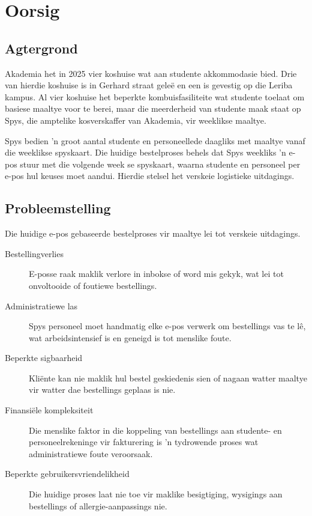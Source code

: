 \section{Oorsig}

\subsection{Agtergrond}
Akademia het in 2025 vier koshuise wat aan studente akkommodasie bied. Drie van
hierdie koshuise is in Gerhard straat geleë en een is gevestig op die Leriba
kampus. Al vier koshuise het beperkte kombuisfasiliteite wat studente toelaat om
basiese maaltye voor te berei, maar die meerderheid van studente maak staat op
Spys, die amptelike kosverskaffer van Akademia, vir weeklikse maaltye.

Spys bedien 'n groot aantal studente en personeellede daagliks met maaltye vanaf
die weeklikse spyskaart. Die huidige bestelproses behels dat Spys weekliks 'n
e-pos stuur met die volgende week se spyskaart, waarna studente en personeel per
e-pos hul keuses moet aandui. Hierdie stelsel het verskeie logistieke
uitdagings.

\subsection{Probleemstelling}
Die huidige e-pos gebaseerde bestelproses vir maaltye lei tot
verskeie uitdagings.

\begin{description}
  \item[Bestellingverlies] E-posse raak maklik verlore in inbokse of
    word mis gekyk, wat lei tot onvoltooide of foutiewe bestellings.
  \item[Administratiewe las] Spys personeel moet handmatig elke e-pos
    verwerk om bestellings vas te lê, wat arbeidsintensief is en
    geneigd is tot menslike foute.  \item[Beperkte sigbaarheid] Kliënte kan nie maklik hul
    bestel geskiedenis sien of nagaan watter maaltye vir watter dae
    bestellings geplaas is nie.
  \item[Finansiële kompleksiteit] Die menslike faktor in die
    koppeling van bestellings aan studente- en personeelrekeninge vir
    fakturering is 'n tydrowende proses wat administratiewe foute veroorsaak.
  \item[Beperkte gebruikersvriendelikheid] Die huidige proses laat
    nie toe vir maklike besigtiging, wysigings aan bestellings of
    allergie-aanpassings nie.
\end{description}

